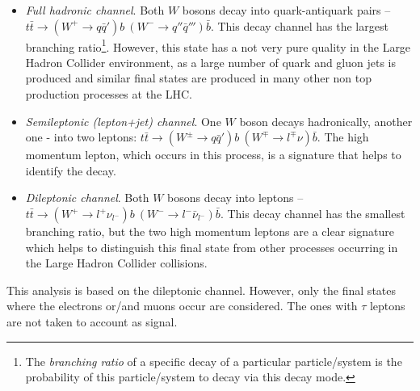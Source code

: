 \begin{itemize}
 \item \textit{Full hadronic channel}. Both $W$ bosons decay into quark-antiquark pairs -- $t\bar{t} \rightarrow (W^{+} \rightarrow q\bar{q}')b\:(W^{-} \rightarrow q''\bar{q}''')\bar{b}$.
 This decay channel has the largest branching ratio\footnote{The \textit{branching ratio} of a specific decay of a particular particle/system is the probability of this particle/system
 to decay via this decay mode.}. However, this state has a not very pure quality in the Large Hadron Collider environment, as a large number of quark and gluon jets is produced and similar
 final states are produced in many other non top production processes at the LHC.
 
 \item \textit{Semileptonic (lepton+jet) channel}. One $W$ boson decays hadronically, another one - into two leptons:  $t\bar{t} \rightarrow (W^{\pm} \rightarrow q\bar{q}')b \: (W^{\mp} \rightarrow l^{\mp}\nu)\bar{b}$.
 The high momentum lepton, which occurs in this process, is a signature that helps to identify the decay.
 
 \item \textit{Dileptonic channel}. Both $W$ bosons decay into leptons -- $t\bar{t} \rightarrow (W^{+} \rightarrow l^{+}\nu_{l^{-}})b \: (W^{-} \rightarrow l^{-}\bar{\nu}_{l^{-}})\bar{b}$.
 This decay channel has the smallest branching ratio, but the two high momentum leptons are a clear signature which helps to distinguish this final state from other processes
 occurring in the Large Hadron Collider collisions.
\end{itemize}

This analysis is based on the dileptonic channel. However, only the final states where the electrons or/and muons occur are considered. The ones with $\tau$ leptons are 
not taken to account as signal.


% 
